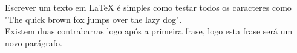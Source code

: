 \documentclass{article}
\begin{document}
	Escrever um texto em LaTeX é simples como testar todos os caracteres como "The quick brown fox jumps over the lazy dog". \\ Existem duas contrabarras logo após a primeira frase, logo esta frase será um novo parágrafo.
\end{document}
